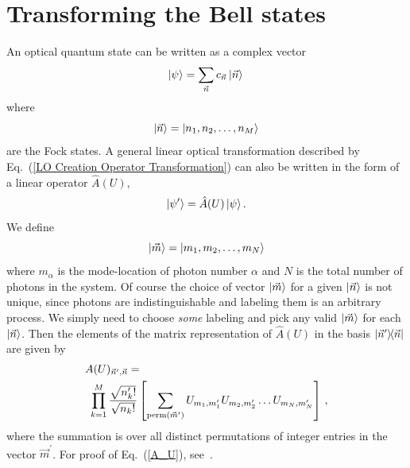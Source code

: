 \documentclass[aps,pra,twocolumn,showpacs,superscriptaddress,floatfix,10pt]{revtex4}
\begin{document}
\section{Transforming the Bell states}
An optical quantum state can be written as a complex vector
\begin{equation}
\label{LO State Fock Vec Basis}
\ket{\psi} = \sum_{\vec{n}} c_{\vec{n}} \ket{\vec{n}} \,
\end{equation}
where
\begin{equation}
\ket{\vec{n}} = \ket{n_1,n_2,\dots,n_M}
\end{equation}
are the Fock states. A general linear optical transformation described by Eq.~(\ref{LO Creation Operator Transformation}) can also be written in the form of a linear operator $\hat{A}(U)$,
\begin{equation}
	\ket{\psi^\prime} = \hat{A}(U) \ket{\psi}.
\end{equation}
We define
\begin{equation}
\label{m definition}
\ket{\vec{m}} = \ket{m_1,m_2,\dots,m_N}
\end{equation}
where $m_\alpha$ is the mode-location of photon number $\alpha$ and $N$ is the total number of photons in the system. Of course the choice of vector $\ket{\vec{m}}$ for a given $\ket{\vec{n}}$ is not unique, since photons are indistinguishable and labeling them is an arbitrary process. We simply need to choose \textit{some} labeling and pick any valid $\ket{\vec{m}}$ for each $\ket{\vec{n}}$. Then the elements of the matrix representation of $\hat{A}(U)$ in the basis $\outerproduct{\vec{n}^\prime}{\vec{n}}$ are given by
\begin{eqnarray}
\label{A_U}
A(U)_{\vec{n}^\prime,\vec{n}} = \quad \quad \quad \quad \quad \quad \quad \quad \quad \quad \quad \quad \quad \quad \quad \quad \quad \\ \small \nonumber \prod_{k=1}^{M} \frac{\sqrt{n_k^\prime !}}{\sqrt{n_k !}} \left[\sum_{\textrm{perm}(\vec{m}^\prime)} U_{m_1, m_1^\prime} U_{m_2, m_2^\prime} \dots U_{m_N, m_N^\prime} \right] \,,
\end{eqnarray}
where the summation is over all distinct permutations of integer entries in the vector $\vec{m}^\prime$. For proof of Eq.~(\ref{A_U}), see~\cite{Jake Smith}.
\end{document}
